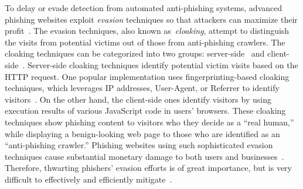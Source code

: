 To delay or evade detection from automated anti-phishing systems, advanced phishing websites exploit \emph{evasion} techniques so that attackers can maximize their profit~\cite{thomas2017data}.
The evasion techniques, also known as~\emph{cloaking}, 
attempt to distinguish the visits from potential victims out of those from anti-phishing crawlers.
The cloaking techniques can be categorized into two groups: server-side~\cite{oest2018inside} and client-side~\cite{zhang2021crawlphish}.
Server-side cloaking techniques identify potential victim visits based on the HTTP request.
One popular implementation uses fingerprinting-based cloaking techniques, which leverages IP addresses, User-Agent, or Referrer to identify visitors~\cite{oest2018inside}.
On the other hand, the client-side ones identify visitors by using execution results of various JavaScript code in users' browsers.
These cloaking techniques show phishing content to visitors who they decide as a ``real human,'' while displaying a benign-looking web page to those who are identified as an ``anti-phishing crawler.''
Phishing websites using such sophisticated evasion techniques cause substantial monetary damage to both users and businesses~\cite{oest2020sunrise}.
Therefore, thwarting phishers' evasion efforts is of great importance, but is very difficult to effectively and efficiently mitigate~\cite{oest2020sunrise, zhang2021crawlphish}.

